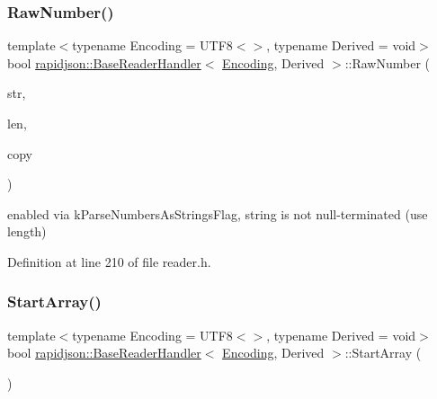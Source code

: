 \subsubsection{\texorpdfstring{RawNumber()}{RawNumber()}}
{\footnotesize\ttfamily template$<$typename Encoding = U\+T\+F8$<$$>$, typename Derived = void$>$ \\
bool \mbox{\hyperlink{structrapidjson_1_1_base_reader_handler}{rapidjson\+::\+Base\+Reader\+Handler}}$<$ \mbox{\hyperlink{classrapidjson_1_1_encoding}{Encoding}}, Derived $>$\+::Raw\+Number (\begin{DoxyParamCaption}\item[{const \mbox{\hyperlink{structrapidjson_1_1_base_reader_handler_a2932a8ecbb1997dda305f4dbef32ab0d}{Ch}} $\ast$}]{str,  }\item[{\mbox{\hyperlink{namespacerapidjson_a44eb33eaa523e36d466b1ced64b85c84}{Size\+Type}}}]{len,  }\item[{bool}]{copy }\end{DoxyParamCaption})}



enabled via k\+Parse\+Numbers\+As\+Strings\+Flag, string is not null-\/terminated (use length) 



Definition at line 210 of file reader.\+h.


\begin{DoxyCode}{0}

\end{DoxyCode}
\mbox{\label{structrapidjson_1_1_base_reader_handler_a0c6fba36350848cb691879758b2d8d59}} 
\subsubsection{\texorpdfstring{StartArray()}{StartArray()}}
{\footnotesize\ttfamily template$<$typename Encoding = U\+T\+F8$<$$>$, typename Derived = void$>$ \\
bool \mbox{\hyperlink{structrapidjson_1_1_base_reader_handler}{rapidjson\+::\+Base\+Reader\+Handler}}$<$ \mbox{\hyperlink{classrapidjson_1_1_encoding}{Encoding}}, Derived $>$\+::Start\+Array (\begin{DoxyParamCaption}{ }\end{DoxyParamCaption})}



